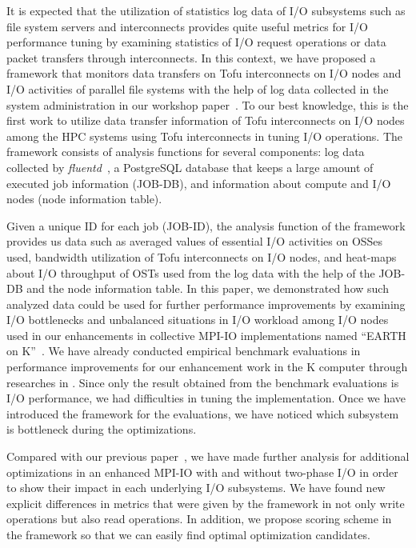 \documentclass{jhps}
\begin{document}
It is expected that the utilization of statistics log data of I/O subsystems
such as file system servers and interconnects provides quite useful metrics
for I/O performance tuning by examining statistics
of I/O request operations or data packet transfers through interconnects.
In this context, we have proposed a framework that monitors data transfers
on Tofu interconnects on I/O nodes and I/O activities of parallel file systems
with the help of log data collected in the system administration
in our workshop paper~\cite{tsujita:hpc_iodc20}.
To our best knowledge, this is the first work to utilize data transfer information of
Tofu interconnects on I/O nodes among the HPC systems using Tofu interconnects
in tuning I/O operations.
The framework consists of analysis functions for several components:
log data collected by {\itshape fluentd}~\cite{fluentd:web},
a PostgreSQL database that keeps a large amount of executed job information (JOB-DB),
and information about compute and I/O nodes (node information table).

Given a unique ID for each job (JOB-ID), the analysis function of the framework
provides us data such as averaged values of essential I/O activities on OSSes used,
bandwidth utilization of Tofu interconnects on I/O nodes, and heat-maps about
I/O throughput of OSTs used from the log data with the help of the JOB-DB
and the node information table.
In this paper, we demonstrated how such analyzed data could be used for further
performance improvements by examining I/O bottlenecks and unbalanced situations
in I/O workload among I/O nodes used in our enhancements in collective MPI-IO
implementations named ``EARTH on K''~\cite{tsujita:WS_EuroMPI2014,tsujita:hpcasia18}.
We have already conducted empirical benchmark evaluations
in performance improvements for our enhancement work in the K computer
through researches in \cite{tsujita:WS_EuroMPI2014,tsujita:hpcasia18}.
Since only the result obtained from the benchmark evaluations is I/O performance,
we had difficulties in tuning the implementation.
Once we have introduced the framework for the evaluations,
we have noticed which subsystem is bottleneck during the optimizations.

Compared with our previous paper~\cite{tsujita:hpc_iodc20},
we have made further analysis for additional optimizations
in an enhanced MPI-IO with and without two-phase I/O
in order to show their impact in each underlying I/O subsystems.
We have found new explicit differences in metrics that were given
by the framework in not only write operations but also read operations.
In addition, we propose scoring scheme in the framework
so that we can easily find optimal optimization candidates.
\end{document}
